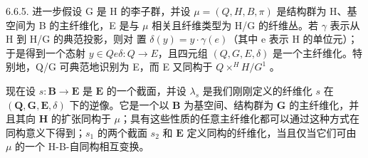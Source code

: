 6.6.5. 进一步假设 G 是 H 的李子群，并设 \(\mu = (Q, H, B, \pi)\) 是结构群为 H、基空间为 B 的主纤维化，E 是与 \(\mu\) 相关且纤维类型为 H/G 的纤维丛。若 \(\gamma\) 表示从 H 到 H/G 的典范投影，则对  置 \(\delta(y) = y \cdot \gamma(e)\)（其中 e 表示 H 的单位元）；于是得到一个态射 \(y \in Q\)\(e\)\(\delta: Q \to E\)，且四元组 \((Q, G, E, \delta)\) 是一个主纤维化。特别地，Q/G 可典范地识别为 E，而 E 又同构于 \(Q \times^{H} H/G^{1}\) 。

现在设 \(s: \mathbf{B} \to \mathbf{E}\) 是 \(\mathbf{E}\) 的一个截面，并设 \(\lambda_s\) 是我们刚刚定义的纤维化 \(s\) 在 \((\mathbf{Q}, \mathbf{G}, \mathbf{E}, \delta)\) 下的逆像。它是一个以 \(\mathbf{B}\) 为基空间、结构群为 \(\mathbf{G}\) 的主纤维化，并且其向 \(\mathbf{H}\) 的扩张同构于 \(\mu\)；具有这些性质的任意主纤维化都可以通过这种方式在同构意义下得到；\(s_1\) 的两个截面 \(s_2\) 和 \(\mathbf{E}\) 定义同构的纤维化，当且仅当它们可由 \(\mu\) 的一个 H-B-自同构相互变换。

